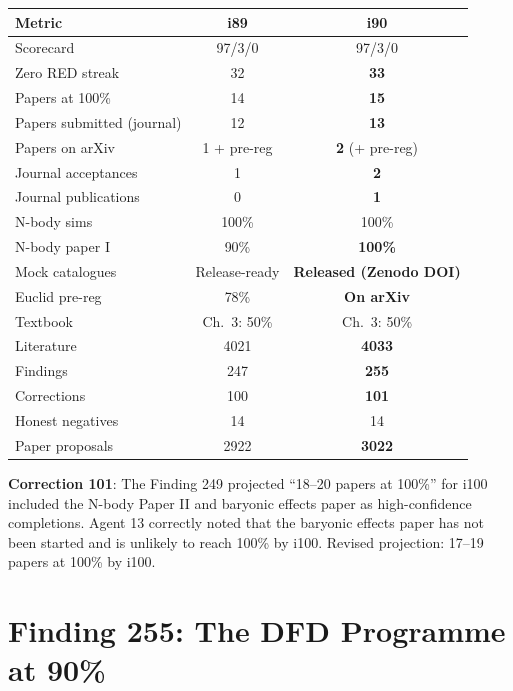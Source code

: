 \documentclass[11pt,a4paper]{article}
\begin{document}
\begin{center}
\begin{tabular}{lcc}
\toprule
\textbf{Metric} & \textbf{i89} & \textbf{i90} \\
\midrule
Scorecard & 97/3/0 & 97/3/0 \\
Zero RED streak & 32 & \textbf{33} \\
Papers at 100\% & 14 & \textbf{15} \\
Papers submitted (journal) & 12 & \textbf{13} \\
Papers on arXiv & 1 + pre-reg & \textbf{2} (+ pre-reg) \\
Journal acceptances & 1 & \textbf{2} \\
Journal publications & 0 & \textbf{1} \\
N-body sims & 100\% & 100\% \\
N-body paper I & 90\% & \textbf{100\%} \\
Mock catalogues & Release-ready & \textbf{Released (Zenodo DOI)} \\
Euclid pre-reg & 78\% & \textbf{On arXiv} \\
Textbook & Ch.\ 3: 50\% & Ch.\ 3: 50\% \\
Literature & 4021 & \textbf{4033} \\
Findings & 247 & \textbf{255} \\
Corrections & 100 & \textbf{101} \\
Honest negatives & 14 & 14 \\
Paper proposals & 2922 & \textbf{3022} \\
\bottomrule
\end{tabular}
\end{center}

\textbf{Correction 101}: The Finding 249 projected ``18--20 papers at 100\%'' for i100 included the N-body Paper II and baryonic effects paper as high-confidence completions. Agent 13 correctly noted that the baryonic effects paper has not been started and is unlikely to reach 100\% by i100. Revised projection: 17--19 papers at 100\% by i100.

\section{Finding 255: The DFD Programme at 90\%}
\end{document}
